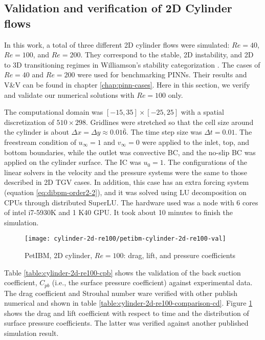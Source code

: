 \subsection*{Validation and verification of 2D Cylinder flows}

In this work, a total of three different 2D cylinder flows were simulated: $Re=40$, $Re=100$, and $Re=200$.
They correspond to the stable, 2D instability, and 2D to 3D transitioning regimes in Williamson's stability categorization \cite{williamson_vortex_1996}. 
The cases of $Re=40$ and $Re=200$ were used for benchmarking PINNs.
Their results and V\&V can be found in chapter \ref{chap:pinn-cases}.
Here in this section, we verify and validate our numerical solutions with $Re=100$ only.

The computational domain was $[-15, 35]\times[-25, 25]$ with a spatial discretization of $510 \times 298$.
Gridlines were stretched so that the cell size around the cylinder is about $\Delta x = \Delta y \approx 0.01\bar{6}$.
The time step size was $\Delta t = 0.01$.
The freestream condition of $u_{\infty}=1$ and $v_{\infty}=0$ were applied to the inlet, top, and bottom boundaries, while the outlet was convective BC, and the no-slip BC was applied on the cylinder surface.
The IC was $u_0=1$.
The configurations of the linear solvers in the velocity and the pressure systems were the same to those described in 2D TGV cases.
In addition, this case has an extra forcing system (equation \eqref{eq:dibpm-order2-2}), and it was solved using LU decomposition on CPUs through distributed SuperLU.
The hardware used was a node with 6 cores of intel i7-5930K and 1 K40 GPU.
It took about 10 minutes to finish the simulation.




\begin{figure}[H]
    \texttt{[image: cylinder-2d-re100/petibm-cylinder-2d-re100-val]}
    \caption{PetIBM, 2D cylinder, $Re=100$: drag, lift, and pressure coefficients}
    \label{fig:petibm-cylinder-2d-re100-val}
\end{figure}

Table \ref{table:cylinder-2d-re100-cpb} shows the validation of the back suction coefficient, $C_{pb}$ (i.e., the surface pressure coefficient) against experimental data.
The drag coefficient and Strouhal number ware verified with other publish numerical and shown in table \ref{table:cylinder-2d-re100-comparison-cd}.
Figure \ref{fig:petibm-cylinder-2d-re100-val} shows the drag and lift coefficient with respect to time and the distribution of surface pressure coefficients.
The latter was verified against another published simulation result.

